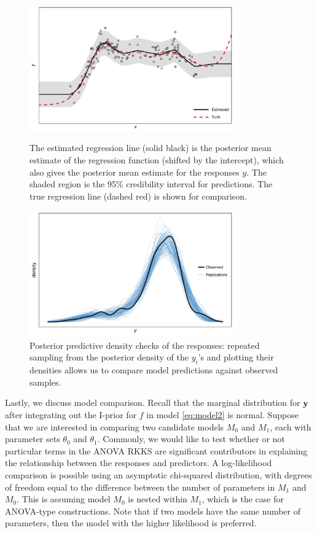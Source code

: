 \begin{figure}[p]
  \centering
  \includegraphics[width=0.785\textwidth]{figure/04-post_reg_cred}
  \caption[Posterior regression and credibility intervals]{The estimated regression line (solid black) is the posterior mean estimate of the regression function (shifted by the intercept), which also gives the posterior mean estimate for the responses $y$. The shaded region is the 95\% credibility interval for predictions. The true regression line (dashed red) is shown for comparison.}
  \vspace{2em}
  \includegraphics[width=0.785\textwidth]{figure/04-post_reg_ppc}
  \caption[Posterior predictive density check]{Posterior predictive density checks of the responses: repeated sampling from the posterior density of the $y_i$'s and plotting their densities allows us to compare model predictions against observed samples.}
\end{figure}

Lastly, we discuss model comparison.
Recall that the marginal distribution for ${\mathbf y}$ after integrating out the I-prior for $f$ in model \cref{eq:model2} is normal.
Suppose that we are interested in comparing two candidate models $M_0$ and $M_1$, each with parameter sets $\theta_0$ and $\theta_1$.
Commonly, we would like to test whether or not particular terms in the ANOVA RKKS are significant contributors in explaining the relationship between the responses and predictors.
A log-likelihood comparison is possible using an asymptotic chi-squared distribution, with degrees of freedom equal to the difference between the number of parameters in $M_1$ and $M_0$.
This is assuming model $M_0$ is nested within $M_1$, which is the case for ANOVA-type constructions.
Note that if two models have the same number of parameters, then the model with the higher likelihood is preferred.

